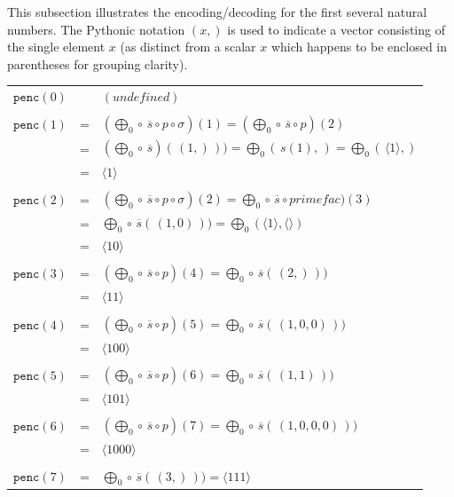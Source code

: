 \documentclass[12pt,reqno]{article}
\begin{document}
This subsection illustrates the encoding/decoding for the first several natural numbers. The Pythonic notation $(x, )$ is used to indicate a vector consisting of the single element $x$ (as distinct from a scalar $x$ which happens to be enclosed in parentheses for grouping clarity).

\begin{center} \begin{tabular}{l c l}
  $\texttt{penc}(0)$ &    & $(undefined)$ \\
  \\
  $\texttt{penc}(1)$ & = & $(\bigoplus_0 \circ \, \overline{s} \circ p \circ \sigma) (1) = (\bigoplus_0 \circ \, \overline{s} \circ p) (2) $ \\
                              & = & $(\bigoplus_0 \circ \, \overline{s}) (\, (1,) \, )) = \bigoplus_0 ( \, s(1), \,) = \bigoplus_0 ( \, \langle 1 \rangle, )$ \\
                              & = & $\langle 1 \rangle$ \\
  \\
  $\texttt{penc}(2)$ & = & $(\bigoplus_0 \circ \, \overline{s} \circ p \circ \sigma) (2) = \bigoplus_0 \circ \, \overline{s} \circ primefac) (3)$ \\
                              & = & $\bigoplus_0 \circ \, \overline{s} (\, (1, 0) \, )) = \bigoplus_0 ( \langle 1 \rangle, \langle \rangle )$ \\
                              & = & $\langle 10 \rangle$ \\
  \\
  $\texttt{penc}(3)$ & = & $(\bigoplus_0 \circ \, \overline{s} \circ p) (4) = \bigoplus_0 \circ \, \overline{s} (\, (2,) \, )) $ \\
                              & = & $\langle 11 \rangle $ \\
  \\
  $\texttt{penc}(4)$ & = & $(\bigoplus_0 \circ \, \overline{s} \circ p) (5) = \bigoplus_0 \circ \, \overline{s} (\, (1, 0, 0) \, )) $ \\
                               & = & $\langle 100 \rangle$ \\
  \\
  $\texttt{penc}(5)$ & = & $(\bigoplus_0 \circ \, \overline{s} \circ p) (6) = \bigoplus_0 \circ \, \overline{s} (\, (1, 1) \, ))$ \\
                              & = & $\langle 101 \rangle$ \\
  \\
  $\texttt{penc}(6)$ & = & $(\bigoplus_0 \circ \, \overline{s} \circ p) (7) = \bigoplus_0 \circ \, \overline{s} (\, (1, 0, 0, 0) \, )) $ \\
                              & = & $\langle 1000 \rangle$ \\
  \\
  $\texttt{penc}(7)$ & = & $\bigoplus_0 \circ \, \overline{s} (\, (3,) \, )) = \langle 111 \rangle$ \\
\end{tabular} \end{center}
\end{document}

